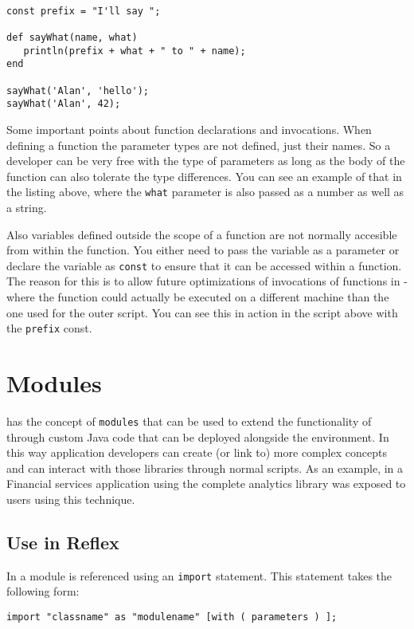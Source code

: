 \begin{lstlisting}[caption={Function definition}]

const prefix = "I'll say ";

def sayWhat(name, what)
   println(prefix + what + " to " + name);
end

sayWhat('Alan', 'hello');
sayWhat('Alan', 42);

\end{lstlisting}

Some important points about function declarations and invocations. When defining a function the parameter types are not defined, just their names. So a developer can be very free with the type of parameters as long as the body of the function can also tolerate the type differences. You can see an example of that in the listing above, where the \Verb+what+ parameter is also passed as a number as well as a string.

Also variables defined outside the scope of a function are not normally accesible from within the function. You either need to pass the variable as a parameter or declare the variable as \Verb+const+ to ensure that it can be accessed within a function. The reason for this is to allow future optimizations of invocations of functions in \Reflex - where the function could actually be executed on a different machine than the one used for the outer script. You can see this in action in the script above with the \verb+prefix+ const.

\chapter{Modules}
\Reflex has the concept of \Verb+modules+ that can be used to extend the functionality of \Reflex through custom Java code that can be deployed alongside the environment. In this way application developers can create (or link to) more complex concepts and can interact with those libraries through normal \Reflex scripts. As an example, in a Financial services application using \Reflex the complete analytics library was exposed to \Reflex users using this technique.

\section{Use in Reflex}
In \Reflex a module is referenced using an \Verb+import+ statement. This statement takes the following form:
\begin{Verbatim}
import "classname" as "modulename" [with ( parameters ) ];
\end{Verbatim}

